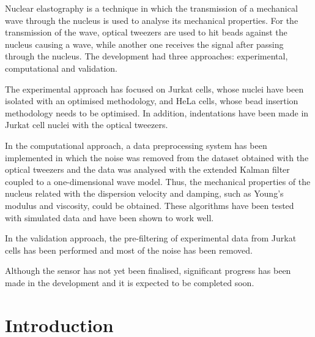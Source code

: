 \documentclass[12pt, a4paper]{article} %
\begin{document}
	Nuclear elastography is a technique in which the transmission of a mechanical wave through the nucleus is used to analyse its mechanical properties. For the transmission of the wave, optical tweezers are used to hit beads against the nucleus causing a wave, while another one receives the signal after passing through the nucleus. The development had three approaches: experimental, computational and validation. 
	
	The experimental approach has focused on Jurkat cells, whose nuclei have been isolated with an optimised methodology, and HeLa cells, whose bead insertion methodology needs to be optimised. In addition, indentations have been made in Jurkat cell nuclei with the optical tweezers.
	
	In the computational approach, a data preprocessing system has been implemented in which the noise was removed from the dataset obtained with the optical tweezers and the data was analysed with the extended Kalman filter coupled to a one-dimensional wave model. Thus, the mechanical properties of the nucleus related with the dispersion velocity and damping, such as Young's modulus and viscosity, could be obtained. These algorithms have been tested with simulated data and have been shown to work well.
	
	In the validation approach, the pre-filtering of experimental data from Jurkat cells has been performed and most of the noise has been removed.
	
	Although the sensor has not yet been finalised, significant progress has been made in the development and it is expected to be completed soon.
	
	\vspace{1cm}
	
	\newpage
	
	
	\tableofcontents
	\setcounter{tocdepth}{2}
	\newpage
	
	\setcounter{page}{1}
	\pagestyle{fancy}
	\lhead{ }
	\renewcommand{\headrulewidth}{0.005pt}
	
	\setlength{\parskip}{0mm}
	
	\section{Introduction}
	
\end{document}
